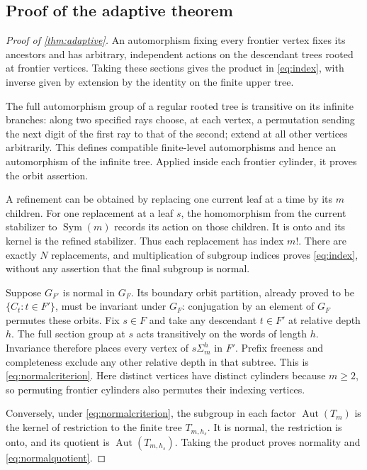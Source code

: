 \documentclass[11pt]{article}
\theoremstyle{definition}
\theoremstyle{remark}
\newcommand{\Aut}{\operatorname{Aut}}
\newcommand{\Sym}{\operatorname{Sym}}
\begin{document}
\subsection{Proof of the adaptive theorem}
\begin{proof}[Proof of \cref{thm:adaptive}]
An automorphism fixing every frontier vertex fixes its ancestors and has arbitrary, independent actions on the descendant trees rooted at frontier vertices. Taking these sections gives the product in \eqref{eq:index}, with inverse given by extension by the identity on the finite upper tree.

The full automorphism group of a regular rooted tree is transitive on its infinite branches: along two specified rays choose, at each vertex, a permutation sending the next digit of the first ray to that of the second; extend at all other vertices arbitrarily. This defines compatible finite-level automorphisms and hence an automorphism of the infinite tree. Applied inside each frontier cylinder, it proves the orbit assertion.

A refinement can be obtained by replacing one current leaf at a time by its $m$ children. For one replacement at a leaf $s$, the homomorphism from the current stabilizer to $\Sym(m)$ records its action on those children. It is onto and its kernel is the refined stabilizer. Thus each replacement has index $m!$. There are exactly $N$ replacements, and multiplication of subgroup indices proves \eqref{eq:index}, without any assertion that the final subgroup is normal.

Suppose $G_{F'}$ is normal in $G_F$. Its boundary orbit partition, already proved to be $\{C_t:t\in F'\}$, must be invariant under $G_F$: conjugation by an element of $G_F$ permutes these orbits. Fix $s\in F$ and take any descendant $t\in F'$ at relative depth $h$. The full section group at $s$ acts transitively on the words of length $h$. Invariance therefore places every vertex of $s\Sigma_m^h$ in $F'$. Prefix freeness and completeness exclude any other relative depth in that subtree. This is \eqref{eq:normalcriterion}. Here distinct vertices have distinct cylinders because $m\geq2$, so permuting frontier cylinders also permutes their indexing vertices.

Conversely, under \eqref{eq:normalcriterion}, the subgroup in each factor $\Aut(T_m)$ is the kernel of restriction to the finite tree $T_{m,h_s}$. It is normal, the restriction is onto, and its quotient is $\Aut(T_{m,h_s})$. Taking the product proves normality and \eqref{eq:normalquotient}.
\end{proof}
\end{document}
